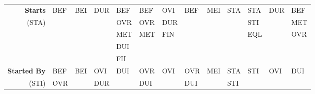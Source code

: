 \documentclass[11pt]{report}
\newenvironment{vvarmargin}[2]
{
  \begin{list}{}
  {
    \setlength{\topsep}{0pt}
    \setlength{\leftmargin}{0pt}
    \setlength{\rightmargin}{0pt}
    \setlength{\listparindent}{\parindent}
    \setlength{\itemindent}{\parindent}
    \setlength{\parsep}{0pt plus 1pt}
    \addtolength{\leftmargin}{#1}\addtolength{\rightmargin}{#2}
  }
  \item
}
{
  \end{list}
}
\begin{document}
\begin{table}[p]
\begin{vvarmargin}{-4cm}{-4cm}
\begin{center}
\begin{tabular}[t]{|r|l|l|l|l|l|l|l|l|l|l|l|l|}
                \hline
                \textbf{Starts}         & BEF                     & BEI                     & DUR                     & BEF                     & BEF                     & OVI                     & BEF                     & MEI                     & STA                     & STA                     & DUR                     & BEF                     \\
                (STA)                   &                         &                         &                         & OVR                     & OVR                     & DUR                     &                         &                         &                         & STI                     &                         & MET                     \\
                                        &                         &                         &                         & MET                     & MET                     & FIN                     &                         &                         &                         & EQL                     &                         & OVR                     \\
                                        &                         &                         &                         & DUI                     &                         &                         &                         &                         &                         &                         &                         &                         \\
                                        &                         &                         &                         & FII                     &                         &                         &                         &                         &                         &                         &                         &                         \\
                \hline
                \textbf{Started By}     & BEF                     & BEI                     & OVI                     & DUI                     & OVR                     & OVI                     & OVR                     & MEI                     & STA                     & STI                     & OVI                     & DUI                     \\
                (STI)                   & OVR                     &                         & DUR                     &                         & DUI                     &                         & DUI                     &                         & STI                     &                         &                         &                         \\

\end{tabular}
\end{center}
\end{vvarmargin}
\end{table}
\end{document}

